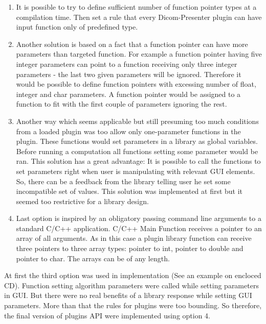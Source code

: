 \begin{enumerate}
\item It is possible to try to define sufficient number of function pointer types at a compilation time. Then set a rule that every Dicom-Presenter plugin can have input function only of predefined type.
\item Another solution is based on a fact that a function pointer can have more parameters than targeted function. For example a function pointer having five integer parameters can point to a function receiving only three integer parameters - the last two given parameters will be ignored. Therefore it would be possible to define function pointers with excessing number of float, integer and char parameters. A function pointer would be assigned to a function to fit with the first couple of parameters ignoring the rest.
\item Another way which seems applicable but still presuming too much conditions from a loaded plugin was too allow only one-parameter functions in the plugin. These functions would set parameters in a library as global variables. Before running a computation all functions setting some parameter would be ran. This solution has a great advantage: It is possible to call the functions to set parameters right when user is manipulating with relevant GUI elements. So, there can be a feedback from the library telling user he set some incompatible set of values. This solution was implemented at first but it seemed too restrictive for a library design. 
\item Last option is inspired by an obligatory passing command line arguments to a standard C/C++ application. C/C++ Main Function receives a pointer to an array of all arguments. As in this case a plugin library function can receive three pointers to three array types: pointer to int, pointer to double and pointer to char. The arrays can be of any length.
\end{enumerate}

At first the third option was used in implementation (See an example on encloced CD). Function setting algorithm parameters were called while setting parameters in GUI. But there were no real benefits of a library response while setting GUI parameters. More than that the rules for plugins were too bounding. So therefore, the final version of plugins API were implemented using option 4.

